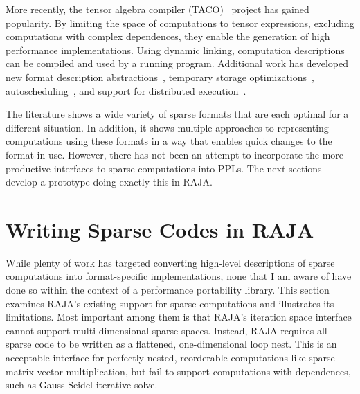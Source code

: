 More recently, the tensor algebra compiler (TACO)~\cite{kjolstad2017tensor} project has gained popularity.
By limiting the space of computations to tensor expressions, excluding computations with complex dependences, they enable the generation of high performance implementations.
Using dynamic linking, computation descriptions can be compiled and used by a running program.
Additional work has developed new format description abstractions~\cite{chou2018format}, temporary storage optimizations~\cite{kjolstad2019tensor}, autoscheduling~\cite{ahrens2022autoscheduling}, and support for distributed execution~\cite{yadav2022distal}.

The literature shows a wide variety of sparse formats that are each optimal for a different situation.
In addition, it shows multiple approaches to representing computations using these formats in a way that enables quick changes to the format in use.
However, there has not been an attempt to incorporate the more productive interfaces to sparse computations into PPLs.
The next sections develop a prototype doing exactly this in RAJA\@.

\section{Writing Sparse Codes in RAJA}\label{sec:IndexSets}

While plenty of work has targeted converting high-level descriptions of sparse computations into format-specific implementations, none that I am aware of have done so within the context of a performance portability library.
This section examines RAJA's existing support for sparse computations and illustrates its limitations.
Most important among them is that RAJA's iteration space interface cannot support multi-dimensional sparse spaces.
Instead, RAJA requires all sparse code to be written as a flattened, one-dimensional loop nest.
This is an acceptable interface for perfectly nested, reorderable computations like sparse matrix vector multiplication, but fail to support computations with dependences, such as Gauss-Seidel iterative solve.

